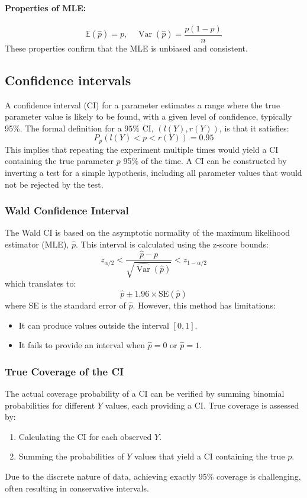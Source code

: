 \documentclass{article}
\begin{document}
\paragraph{Properties of MLE:}
\[
\mathbb{E}(\hat{p}) = p, \quad \operatorname{Var}(\hat{p}) = \frac{p(1-p)}{n}
\]
These properties confirm that the MLE is unbiased and consistent.

\subsection{Confidence intervals}

A confidence interval (CI) for a parameter estimates a range where the true parameter value is likely to be found, with a given level of confidence, typically 95\%. The formal definition for a $95\%$ CI, $(l(Y), r(Y))$, is that it satisfies:
\[
P_{p}(l(Y) < p < r(Y)) = 0.95
\]
This implies that repeating the experiment multiple times would yield a CI containing the true parameter $p$ 95\% of the time. A CI can be constructed by inverting a test for a simple hypothesis, including all parameter values that would not be rejected by the test.

\subsubsection{Wald Confidence Interval}
The Wald CI is based on the asymptotic normality of the maximum likelihood estimator (MLE), $\hat{p}$. This interval is calculated using the z-score bounds:
\[
z_{\alpha / 2} < \frac{\hat{p} - p}{\sqrt{\widehat{\operatorname{Var}}(\hat{p})}} < z_{1 - \alpha / 2}
\]
which translates to:
\[
\hat{p} \pm 1.96 \times \text{SE}(\hat{p})
\]
where SE is the standard error of $\hat{p}$. However, this method has limitations:
\begin{itemize}
  \item It can produce values outside the interval $[0, 1]$.
  \item It fails to provide an interval when $\hat{p} = 0$ or $\hat{p} = 1$.
\end{itemize}

\subsubsection{True Coverage of the CI}
The actual coverage probability of a CI can be verified by summing binomial probabilities for different $Y$ values, each providing a CI. True coverage is assessed by:
\begin{enumerate}
  \item Calculating the CI for each observed $Y$.
  \item Summing the probabilities of $Y$ values that yield a CI containing the true $p$.
\end{enumerate}
Due to the discrete nature of data, achieving exactly 95\% coverage is challenging, often resulting in conservative intervals.
\end{document}
